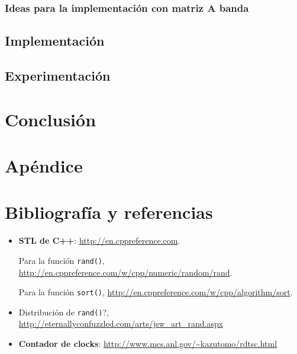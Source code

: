 \subsubsection{Ideas para la implementación con matriz A banda}

\subsection{Implementación}

\subsection{Experimentación}

\section{Conclusión}

\section{Apéndice}

\section{Bibliografía y referencias} %

\begin{itemize}
	\item \textbf{STL de C++}: \url{http://en.cppreference.com}.
	\par Para la función \texttt{rand()}, \url{http://en.cppreference.com/w/cpp/numeric/random/rand}.
	\par Para la función \texttt{sort()}, \url{http://en.cppreference.com/w/cpp/algorithm/sort}.
	\item Distribución de \texttt{rand()}?, \url{http://eternallyconfuzzled.com/arts/jsw\_art\_rand.aspx}
	\item \textbf{Contador de clocks}: \url{http://www.mcs.anl.gov/\~kazutomo/rdtsc.html}
\end{itemize}



